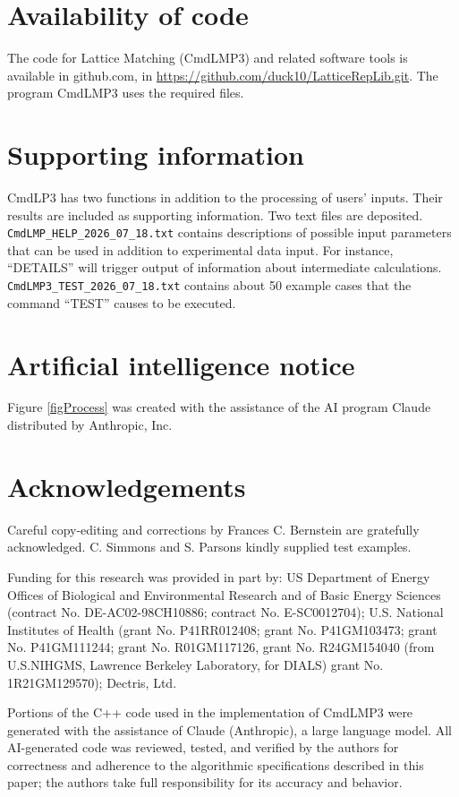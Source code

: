 \documentclass[preprint]{iucr}              %
\numberwithin{equation}{section}
\begin{document}
{\section{Availability of code}
\label {refAvailability}
The code for Lattice Matching (CmdLMP3) and related 
software tools is available in github.com, in
\url{https://github.com/duck10/LatticeRepLib.git}.
The program CmdLMP3 uses the required files.

	
\section{Supporting information}

CmdLP3 has two functions in addition to the processing of
users' inputs. Their results are included as supporting
information. Two text files are deposited. \texttt{CmdLMP\_HELP\_2026\_07\_18.txt}
contains descriptions of possible input parameters that
can be used in addition to experimental data input. For instance,
``DETAILS'' will trigger output of information about intermediate
calculations. 
\texttt{CmdLMP3\_TEST\_2026\_07\_18.txt}
contains about 50 example cases that the command ``TEST''
causes to be executed.


\section{Artificial intelligence notice}
Figure \ref{figProcess} was created with the assistance of the AI program Claude distributed by Anthropic, Inc.

\section{Acknowledgements}

Careful copy-editing and corrections by Frances C. Bernstein are 
gratefully acknowledged. C. Simmons and S. Parsons
kindly supplied test examples.

Funding for this research was provided in part by:  
US Department of Energy Offices of Biological and 
Environmental Research and of Basic Energy Sciences 
(contract No. DE-AC02-98CH10886; contract No. E-SC0012704); 
U.S. National Institutes of Health (grant No. P41RR012408; 
grant No. P41GM103473; grant No. P41GM111244; 
grant No. R01GM117126,
grant No. R24GM154040 (from U.S.NIHGMS, Lawrence Berkeley Laboratory, for DIALS)
grant No. 1R21GM129570); Dectris, Ltd.

Portions of the C++ code used in the implementation of CmdLMP3 
were generated with the assistance of Claude (Anthropic), a large language model.
All AI-generated code was reviewed, tested, and verified by the authors for
correctness and adherence to the algorithmic specifications described in this
paper; the authors take full responsibility for its accuracy and behavior.

}
\end{document}
